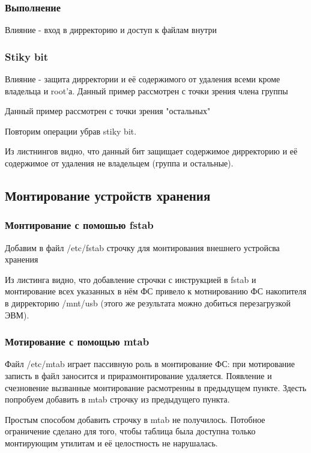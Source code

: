 \documentclass[a4paper]{article}
\begin{document}
\subsubsection{Выполнение}
Влияние - вход в дирректорию и доступ к файлам внутри



\subsubsection{Stiky bit}
Влияние - защита дирректории и её содержимого от удаления всеми кроме владельца и root'а.
Данный пример рассмотрен с точки зрения члена группы

Данный пример рассмотрен с точки зрения "остальных"

Повторим операции убрав stiky bit.

Из листнингов видно, что данный бит защищает содержимое дирректорию и её содержимое от удаления не владельцем (группа и остальные). 

\subsection{Монтирование устройств хранения}
\subsubsection{Монтирование с помошью fstab}
Добавим в файл /etc/fstab строчку для монтирования внешнего устройсва хранения

Из листинга видно, что добавление строчки с инструкцией в fstab и монтирование всех указанных в нём 
ФС привело к мотнированию ФС накопителя в дирректорию /mnt/usb (этого же результата можно добиться перезагрузкой ЭВМ).

\subsubsection{Мотирование с помощью mtab}
Файл /etc/mtab играет пассивную роль в монтирование ФС: при мотирование записть в файл заносится и приразмонтирование удаляется. Появление и счезновение вызванные монтирование расмотренны в предыдущем пункте. Здесть попробуем добавить в mtab строчку из предыдущего пункта.

Простым способом добавить строчку в mtab  не получилось. Потобное ограничение сделано для того, чтобы таблица была доступна только монтирующим утилитам и её целостность не нарушалась.
\end{document}
